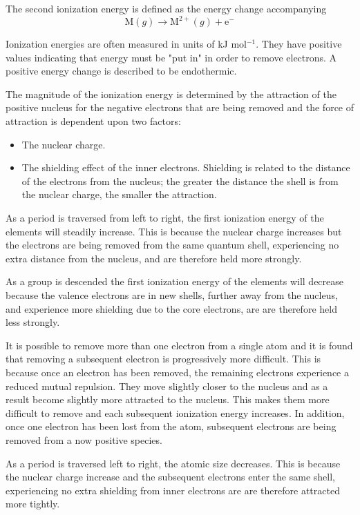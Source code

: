 \documentclass[../chem.tex]{subfiles}
\begin{document}
The second ionization energy is defined as the energy change accompanying 
\[\text{M}(g)\rightarrow\text{M}^{2+}(g)+\text{e}^-\]

Ionization energies are often measured in units of kJ mol$^{-1}$. They have positive values indicating that energy must be 
"put in" in order to remove electrons. A positive energy change is described to be endothermic.

The magnitude of the ionization energy is determined by the attraction of the positive nucleus for the negative electrons that are being removed 
and the force of attraction is dependent upon two factors:
\begin{itemize}
    \item The nuclear charge.
    \item The shielding effect of the inner electrons. Shielding is related to the distance of the electrons from the nucleus; the greater 
    the distance the shell is from the nuclear charge, the smaller the attraction.
\end{itemize}

As a period is traversed from left to right, the first ionization energy of the elements will steadily increase. This is because the nuclear charge increases but the electrons are being removed from the same quantum shell, experiencing no extra distance from the nucleus, and are therefore held more strongly.

As a group is descended the first ionization energy of the elements will decrease because the valence electrons are in new shells, further away from the nucleus, and experience more shielding due to the core electrons, are are therefore held less strongly.

It is possible to remove more than one electron from a single atom and it is found that removing a subsequent electron is progressively more difficult.
This is because once an electron has been removed, the remaining electrons experience a reduced mutual repulsion. They move slightly closer to the nucleus 
and as a result become slightly more attracted to the nucleus. This makes them more difficult to remove and each subsequent ionization energy increases. 
In addition, once one electron has been lost from the atom, subsequent electrons are being removed from a now positive species.

As a period is traversed left to right, the atomic size decreases. This is because the nuclear charge increase and the subsequent electrons 
enter the same shell, experiencing no extra shielding from inner electrons are are therefore attracted more tightly.
\end{document}
